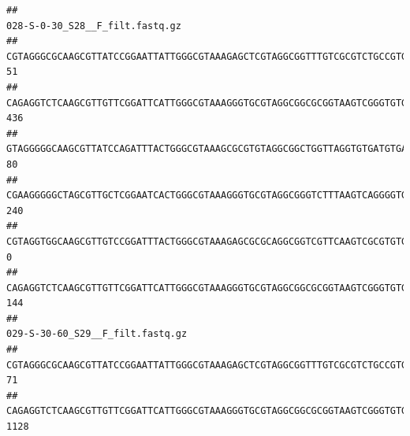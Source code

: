 \documentclass[]{article}
\begin{document}
\begin{verbatim}
##                                                                                                                                                                                                                                                           028-S-0-30_S28__F_filt.fastq.gz
## CGTAGGGCGCAAGCGTTATCCGGAATTATTGGGCGTAAAGAGCTCGTAGGCGGTTTGTCGCGTCTGCCGTGAAAGTCCGGGGCTCAACTCCGGATCTGCGGTGGGTACGGGCAGACTAGAGTGATGTAGGGGAGACTGGAATTCCTGGTGTAGCGGTGAAATGCGCAGATATCAGGAGGAACACCGATGGCGAAGGCAGGTCTCTGGGCATTAACTGACGCTGAGGAGCGAAAGCATGGGGAGCGAACA                              51
## CAGAGGTCTCAAGCGTTGTTCGGATTCATTGGGCGTAAAGGGTGCGTAGGCGGCGCGGTAAGTCGGGTGTGAAATCTCGGAGCTTAACTCCGAAACTGCATTCGATACTGCCGTGCTTGAGGACTGGAGAGGAGACTGGAATTTACGGTGTAGCGGTGAAATGCGTAGATATCGTAAGGAAGACCAGTGGCGAAGGCGGGTCTCTGGACAGTTCCTGACGCTGAGGCACGAAGGCCAGGGGAGCAAACG                             436
## GTAGGGGGCAAGCGTTATCCAGATTTACTGGGCGTAAAGCGCGTGTAGGCGGCTGGTTAGGTGTGATGTGAAATCTTCCGGCTCAACCGGAAAACTGCATTGCAAACCGGCCTGGCTAGAGTGCAGGAGAGGGAAGCGGAATTCCAGGTGTAGCGGTGAAATGCGTAGATATCTGGAGGAACACCAGTGGCGAAGGCGGCTTCCTGGCCTGCAACTGACGCTGAGACGCGAAAGCGTGGGGAGCGAAC                               80
## CGAAGGGGGCTAGCGTTGCTCGGAATCACTGGGCGTAAAGGGTGCGTAGGCGGGTCTTTAAGTCAGGGGTGAAATCCTGGAGCTCAACTCCAGAACTGCCTTTGATACTGAAGATCTTGAGTTCGGGAGAGGTGAGTGGAACTGCGAGTGTAGAGGTGAAATTCGTAGATATTCGCAAGAACACCAGTGGCGAAGGCGGCTCACTGGCCCGATACTGACGCTGAGGCACGAAAGCGTGGGGAGCAAACA                             240
## CGTAGGTGGCAAGCGTTGTCCGGATTTACTGGGCGTAAAGAGCGCGCAGGCGGTCGTTCAAGTCGCGTGTGAAAGCCCCCGGCTCAACTGGGGAGGGTCACGCGATACTGATCGACTCGAAGGCAGGAGAGGGTAGTGGAATTCCCGGTGTAGTGGTGAAATGCGTAGATATCGGGAGGAACACCAGTGGCGAAGGCGACTACCTGGCCTGTTCTTGACGCTGAGGCGCGAAAGCTAGGGGAGCAAACG                               0
## CAGAGGTCTCAAGCGTTGTTCGGATTCATTGGGCGTAAAGGGTGCGTAGGCGGCGCGGTAAGTCGGGTGTGAAATCTCGGGGCTTAACTCCGAAACTGCATTCGATACTGCCGTGCTTGAGGACTGGAGAGGAGACTGGAATTTACGGTGTAGCGGTGAAATGCGTAGATATCGTAAGGAAGACCAGTGGCGAAGGCGGGTCTCTGGACAGTTCCTGACGCTGAGGCACGAAGGCCAGGGGAGCAAACG                             144
##                                                                                                                                                                                                                                                           029-S-30-60_S29__F_filt.fastq.gz
## CGTAGGGCGCAAGCGTTATCCGGAATTATTGGGCGTAAAGAGCTCGTAGGCGGTTTGTCGCGTCTGCCGTGAAAGTCCGGGGCTCAACTCCGGATCTGCGGTGGGTACGGGCAGACTAGAGTGATGTAGGGGAGACTGGAATTCCTGGTGTAGCGGTGAAATGCGCAGATATCAGGAGGAACACCGATGGCGAAGGCAGGTCTCTGGGCATTAACTGACGCTGAGGAGCGAAAGCATGGGGAGCGAACA                               71
## CAGAGGTCTCAAGCGTTGTTCGGATTCATTGGGCGTAAAGGGTGCGTAGGCGGCGCGGTAAGTCGGGTGTGAAATCTCGGAGCTTAACTCCGAAACTGCATTCGATACTGCCGTGCTTGAGGACTGGAGAGGAGACTGGAATTTACGGTGTAGCGGTGAAATGCGTAGATATCGTAAGGAAGACCAGTGGCGAAGGCGGGTCTCTGGACAGTTCCTGACGCTGAGGCACGAAGGCCAGGGGAGCAAACG                             1128

\end{verbatim}
\end{document}
